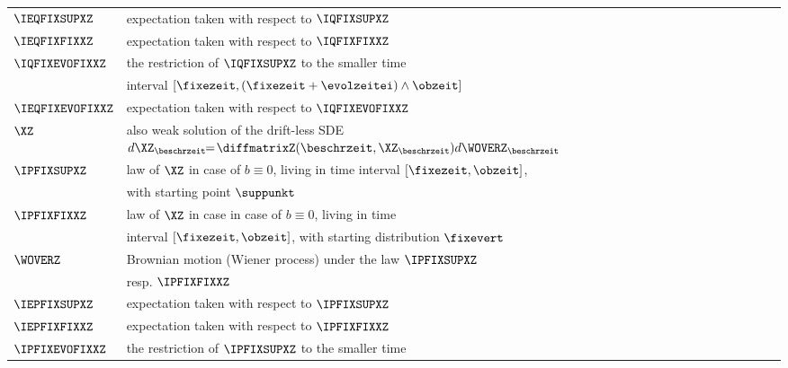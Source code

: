\begin{longtable}{ll}
\hspace{-0.33cm} $\IEQFIXSUPXZ$ & expectation taken with respect to  $\IQFIXSUPXZ$ \\
\hspace{-0.33cm} $\IEQFIXFIXXZ$ & expectation taken with respect to  $\IQFIXFIXXZ$ \\
\hspace{-0.33cm} $\IQFIXEVOFIXXZ$ & the restriction of $\IQFIXSUPXZ$ to the smaller time 
\\
\hspace{-0.33cm} $\ $  & interval $[\fixezeit,(\fixezeit + \evolzeitei) \wedge \obzeit]$ 
\\
\hspace{-0.33cm} $\IEQFIXEVOFIXXZ$ & expectation taken with respect to  $\IQFIXEVOFIXXZ$ 
\\
\hspace{-0.33cm} $\XZ$ & also weak solution of the drift-less
SDE $d\XZ_{\beschrzeit} \negthinspace \negthinspace = \negthinspace \diffmatrixZ({\beschrzeit},\XZ_{\beschrzeit}) d\WOVERZ_{\beschrzeit}$    
\\
\hspace{-0.33cm} $\IPFIXSUPXZ$ & law of $\XZ$ in case of $b \equiv 0$, living in time interval $[\fixezeit,\obzeit]$,
\\
\hspace{-0.33cm} $\ $ & with starting point $\suppunkt$ 
\\
\hspace{-0.33cm} $\IPFIXFIXXZ$ & law of $\XZ$ in case in case of $b \equiv 0$, living in time  
\\
\hspace{-0.33cm} $\ $ & interval $[\fixezeit,\obzeit]$, with starting distribution $\fixevert$ 
\\
\hspace{-0.33cm} $\WOVERZ$ & Brownian motion (Wiener process) under the law $\IPFIXSUPXZ$ 
\\
\hspace{-0.33cm} $\ $ & resp. $\IPFIXFIXXZ$ 
\\
\hspace{-0.33cm} $\IEPFIXSUPXZ$ & expectation taken with respect to  $\IPFIXSUPXZ$ \\
\hspace{-0.33cm} $\IEPFIXFIXXZ$ & expectation taken with respect to  $\IPFIXFIXXZ$ \\
\hspace{-0.33cm} $\IPFIXEVOFIXXZ$ & the restriction of $\IPFIXSUPXZ$ to the smaller time 

\end{longtable}
